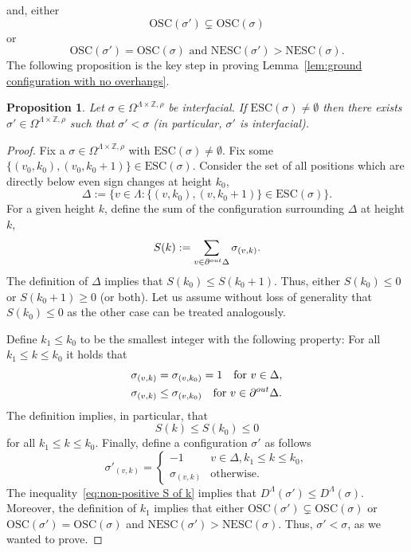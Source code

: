 \documentclass[11pt, reqno]{amsart}
\newtheorem{proposition}[theorem]{Proposition}
\newcommand{\Z}{\mathbb{Z}}
\newcommand{\osc}{\text{OSC}}
\newcommand{\esc}{\text{ESC}}
\newcommand{\nesc}{\text{NESC}}
\numberwithin{equation}{section}
\begin{document}
and, either
\begin{equation*}
\osc(\sigma')\subsetneq\osc(\sigma)
\end{equation*}
or 
\begin{equation*}
\osc(\sigma')=\osc(\sigma)\text{ and } \nesc(\sigma')>\nesc(\sigma).
\end{equation*}
The following proposition is the key step in proving Lemma~\ref{lem:ground configuration with no overhangs}.
\begin{proposition}\label{prop:partial order proposition}
Let $\sigma\in\Omega^{\Lambda\times\Z,\rho}$ be interfacial. 
If $\esc(\sigma)\neq\emptyset$ then there exists $\sigma'\in\Omega^{\Lambda\times\Z,\rho}$ such that $\sigma'<\sigma$ (in particular, $\sigma'$ is interfacial).
\end{proposition}
\begin{proof}
Fix a $\sigma\in\Omega^{\Lambda\times\Z,\rho}$ with $\esc(\sigma)\neq\emptyset$. Fix some $\{(v_0,k_0),(v_0,k_0+1)\}\in\esc(\sigma)$. Consider the set of all positions which are directly below even sign changes at height $k_0$,
\begin{equation*}
\Delta:=\{v\in\Lambda\colon \{(v,k_0),(v,k_0+1)\}\in\esc(\sigma)\}.
\end{equation*}
For a given height $k$, define the sum of the configuration surrounding $\Delta$ at height $k$,
\begin{equation*}
S(k):=\sum_{v\in \partial^{\rm out}\Delta}\sigma_{(v,k)}.
\end{equation*}
The definition of $\Delta$ implies that $S(k_0)\le S(k_0+1)$. Thus, either $S(k_0)\le 0$ or $S(k_0+1)\ge 0$ (or both). Let us assume without loss of generality that $S(k_0)\le 0$
as the other case can be treated analogously.

Define $k_1\le k_0$ to be the smallest integer with the following property: For all $k_1\le k\le k_0$ it holds that
\begin{equation*}
\begin{split}
&\sigma_{(v,k)} = \sigma_{(v,k_0)} = 1\quad\text{for $v\in\Delta$},\\
&\sigma_{(v,k)}\le \sigma_{(v,k_0)}\quad\text{for $v\in\partial^{\rm out}\Delta$}.
\end{split}
\end{equation*}
The definition implies, in particular, that
\begin{equation}\label{eq:non-positive S of k}
S(k)\le S(k_0)\le 0 
\end{equation}
for all $k_1\le k\le k_0$. Finally, define a configuration $\sigma'$ as follows
\begin{equation*}
\sigma'_{(v,k)} = \begin{cases}
-1&v\in\Delta, k_1\le k\le k_0,\\
\sigma_{(v,k)}&\text{otherwise}.
\end{cases}
\end{equation*}
The inequality~\eqref{eq:non-positive S of k} implies that $D^\Lambda(\sigma')\le D^\Lambda(\sigma)$. Moreover, the definition of $k_1$ implies that either $\osc(\sigma')\subsetneq\osc(\sigma)$ or $\osc(\sigma')=\osc(\sigma)$ and $\nesc(\sigma')>\nesc(\sigma)$. Thus, $\sigma'<\sigma$, as we wanted to prove.
\end{proof}
\end{document}
